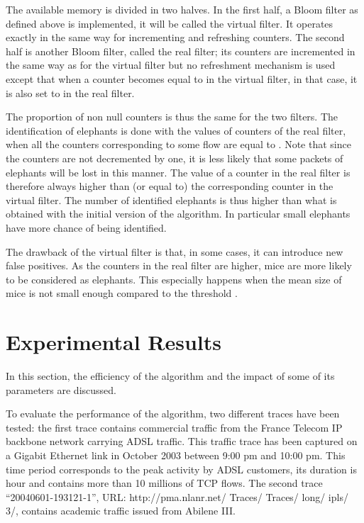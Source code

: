 \documentclass{amsart}
\begin{document}
The available  memory is  divided in two  halves.  In  the first half,  a Bloom  filter as
defined above   is implemented, it will be  called the virtual filter. It  operates exactly in
the same  way for  incrementing and refreshing  counters.  The second half  is another
Bloom filter, called the real filter;  its  counters are incremented in the same way as for
the virtual filter but no refreshment mechanism is used except that when a counter becomes
equal  to   in the  virtual filter, in that case,  it is  also set
to  in the real filter. 

The proportion of  non null counters is  thus the same for  the two filters. The  identification of
elephants is done  with the values of counters  of the real filter, when  all the counters
corresponding  to some  flow  are equal  to  . Note  that since  the  counters are  not
decremented by one, it is less likely that  some packets of elephants will be lost in this
manner. The  value of a  counter in the  real filter is  therefore always higher  than (or
equal  to) the  corresponding counter  in  the virtual  filter. The  number of  identified
elephants is thus higher than what is obtained with the initial version of the algorithm. In
particular small elephants have more chance of being identified.

The drawback of the virtual filter is that, in some cases, it can introduce new false
positives. As the counters in the real filter are  higher, mice are more
likely to be considered as elephants. This especially happens when the
mean  size of mice
is not small enough compared to the threshold .  



\section{Experimental Results}\label{secexpe}
In this section, the efficiency of the  algorithm and the impact of some of its parameters
are   discussed.  

To evaluate the  performance of the algorithm, two different traces  have been tested: the
first  trace contains  commercial  traffic from  the  France Telecom  IP backbone  network
carrying ADSL traffic. This traffic trace has  been captured on a Gigabit Ethernet link in
October 2003 between 9:00 pm and 10:00 pm. This time period corresponds to the peak activity by
ADSL customers, its duration is  hour  and contains more than 10 millions of TCP flows.
The             second            trace             ``20040601-193121-1'',            URL:
http://pma.nlanr.net/ Traces/ Traces/ long/ ipls/ 3/,  contains  academic  traffic issued  from
Abilene III.
\end{document}
